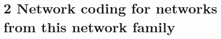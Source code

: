 \chapter{2 Network coding for networks from this network family} \label{chap:network}



\clearpage

